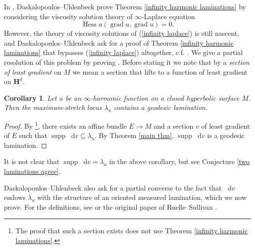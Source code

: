 \documentclass[reqno,10pt]{amsart}
\newcommand{\Hyp}{\mathbf H}
\DeclareMathOperator{\Hess}{Hess}
\DeclareMathOperator{\supp}{supp}
\newcommand*\dif{\mathop{}\!\mathrm{d}}
\DeclareMathOperator{\grad}{grad}
\newcommand{\dfn}[1]{\emph{#1}\index{#1}}
\newtheorem{corollary}[theorem]{Corollary}
\theoremstyle{definition}
\numberwithin{equation}{section}
\begin{document}
In \cite[\S5]{daskalopoulos2020transverse}, Daskalopoulos--Uhlenbeck prove Theorem \ref{infinity harmonic laminations} by considering the viscosity solution theory of $\infty$-Laplace equation
\begin{equation}\label{infinity laplace}
    \Hess u(\grad u, \grad u) = 0.
\end{equation}
However, the theory of viscosity solutions of (\ref{infinity laplace}) is still nascent, and Daskalopoulos--Uhlenbeck ask for a proof of Theorem \ref{infinity harmonic laminations} that bypasses (\ref{infinity laplace}) altogether, c.f. \cite[Problem 9.5]{daskalopoulos2020transverse}.
We give a partial resolution of this problem by proving \cite[Theorem-Conjecture 9.6]{daskalopoulos2020transverse}.
Before stating it we note that by a \dfn{section of least gradient} on $M$ we mean a section that lifts to a function of least gradient on $\Hyp^d$.

\begin{corollary}\label{maximum stretch contains lamination}
Let $u$ be an $\infty$-harmonic function on a closed hyperbolic surface $M$.
Then the maximum-stretch locus $\lambda_u$ contains a geodesic lamination.
\end{corollary}
\begin{proof}
By \cite[\S6]{daskalopoulos2020transverse}\footnote{The proof that such a section exists does not use Theorem \ref{infinity harmonic laminations}.}, there exists an affine bundle $E \to M$ and a section $v$ of least gradient of $E$ such that $\supp \dif v \subseteq \lambda_u$.
By Theorem \ref{main thm}, $\supp \dif v$ is a geodesic lamination.
\end{proof}

It is not clear that $\supp \dif v = \lambda_u$ in the above corollary, but see Conjecture \ref{two laminations agree}.

Daskalopoulos--Uhlenbeck also ask for \cite[Problem 9.7]{daskalopoulos2020transverse} a partial converse to the fact that $\dif v$ endows $\lambda_u$ with the structure of an oriented measured lamination, which we now prove.
For the definitions, see \cite[\S8]{daskalopoulos2020transverse} or the original paper of Ruelle--Sullivan \cite{Ruelle75}.
\end{document}
